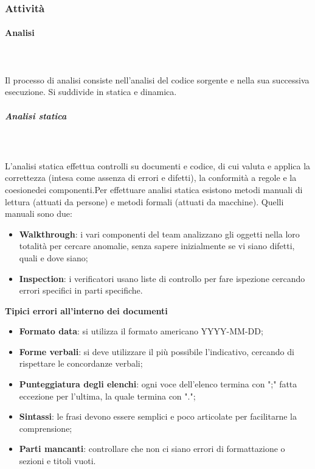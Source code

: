 	\subsubsection{Attività}
		\paragraph{Analisi} \mbox{}\\ \mbox{}\\
		Il processo di analisi consiste nell'analisi del codice sorgente e nella sua successiva esecuzione. Si suddivide in statica e dinamica.\\
			\subparagraph{Analisi statica} \mbox{}\\ \mbox{}\\
			L'analisi statica effettua controlli su documenti e codice, di cui valuta e applica la correttezza (intesa come assenza di errori e difetti), la conformità a regole e la coesione\glosp dei componenti.\newline Per effettuare analisi statica esistono metodi manuali di lettura (attuati da persone) e metodi formali (attuati da macchine). Quelli manuali sono due:
			\begin{itemize}
				\item \textbf{Walkthrough}: i vari componenti del team analizzano gli oggetti nella loro totalità per cercare anomalie, senza sapere inizialmente se vi siano difetti, quali e dove siano;
				\item \textbf{Inspection}: i verificatori usano liste di controllo per fare ispezione cercando errori specifici in parti specifiche.
			\end{itemize}
			\textbf{Tipici errori all'interno dei documenti}
			\begin{itemize}
				\item \textbf{Formato data}: si utilizza il formato americano YYYY-MM-DD;
				\item \textbf{Forme verbali}: si deve utilizzare il più possibile l'indicativo, cercando di rispettare le concordanze verbali;
				\item \textbf{Punteggiatura degli elenchi}: ogni voce dell'elenco termina con ";" fatta eccezione per l'ultima, la quale termina con ".";
				\item \textbf{Sintassi}: le frasi devono essere semplici e poco articolate per facilitarne la comprensione;
				\item \textbf{Parti mancanti}: controllare che non ci siano errori di formattazione o sezioni e titoli vuoti.
			\end{itemize}			
														
